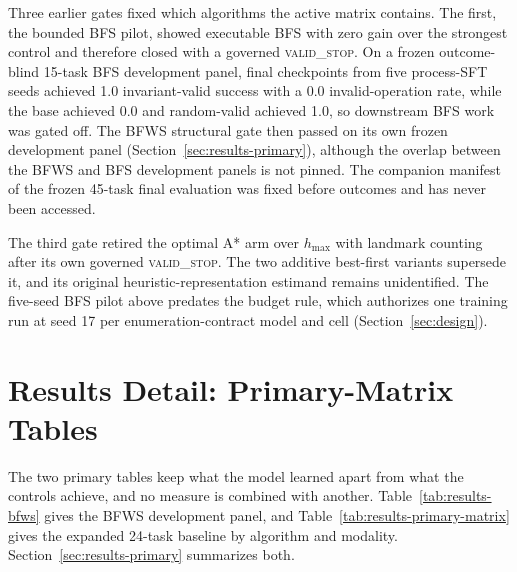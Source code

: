 Three earlier gates fixed which algorithms the active matrix contains. The first, the bounded BFS pilot, showed executable BFS with zero gain over the strongest control and therefore closed with a governed \textsc{valid\_stop}. On a frozen outcome-blind 15-task BFS development panel, final checkpoints from five process-SFT seeds achieved 1.0 invariant-valid success with a 0.0 invalid-operation rate, while the base achieved 0.0 and random-valid achieved 1.0, so downstream BFS work was gated off. The BFWS structural gate then passed on its own frozen development panel (Section~\ref{sec:results-primary}), although the overlap between the BFWS and BFS development panels is not pinned. The companion manifest of the frozen 45-task final evaluation was fixed before outcomes and has never been accessed.

The third gate retired the optimal A* arm over $h_{\max}$ with landmark counting after its own governed \textsc{valid\_stop}. The two additive best-first variants supersede it, and its original heuristic-representation estimand remains unidentified. The five-seed BFS pilot above predates the budget rule, which authorizes one training run at seed 17 per enumeration-contract model and cell (Section~\ref{sec:design}).

\section{Results Detail: Primary-Matrix Tables}
\label{app:results-primary}

The two primary tables keep what the model learned apart from what the controls achieve, and no measure is combined with another. Table~\ref{tab:results-bfws} gives the BFWS development panel, and Table~\ref{tab:results-primary-matrix} gives the expanded 24-task baseline by algorithm and modality. Section~\ref{sec:results-primary} summarizes both.

